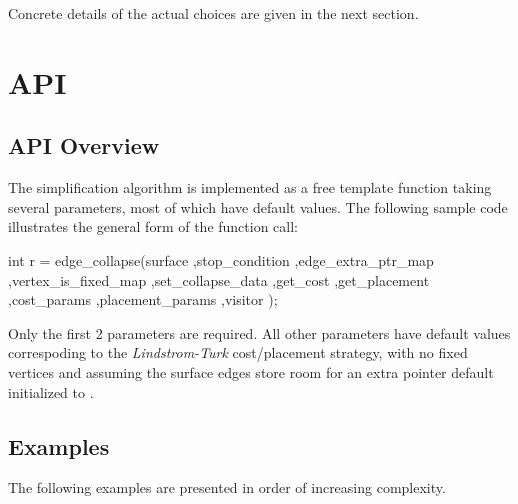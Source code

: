 Concrete details of the actual choices are given in the next section.

\section{API}

\subsection{API Overview}

The simplification algorithm is implemented as a free template function taking several parameters, most of which have default values.
The following sample code illustrates the general form of the function call:

\begin{cprog}
int r = edge_collapse(surface
                     ,stop_condition
                     ,edge_extra_ptr_map
                     ,vertex_is_fixed_map
                     ,set_collapse_data
                     ,get_cost
                     ,get_placement
                     ,cost_params
                     ,placement_params
                     ,visitor 
                     );
\end{cprog}

Only the first 2 parameters are required. All other parameters have default values correspoding to the {\em Lindstrom-Turk} cost/placement strategy, with no fixed vertices and assuming the surface edges store room for an extra pointer default initialized to .

\subsection{Examples}
The following examples are presented in order of increasing complexity.





